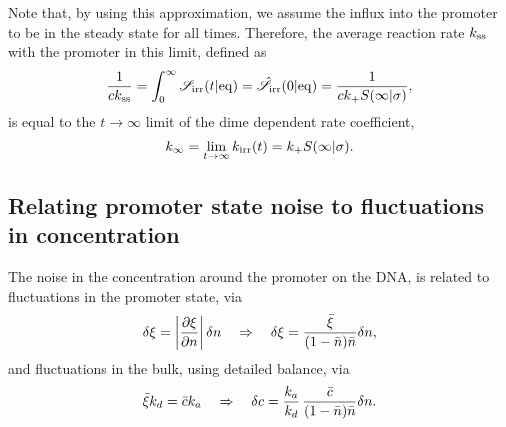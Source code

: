 Note that, by using this approximation, we assume the influx into the promoter to be in the steady state for all times. Therefore, the average reaction rate $k_{\rm ss}$ with the promoter in this limit, defined as
\begin{equation}
 \frac{1}{c k_{\rm ss}} = \int_0^\infty \mathscr{S}_{\rm irr}(t|{\rm eq}) = \hat{\mathscr{S}}_{\rm irr}(0|{\rm eq}) = \frac{1}{c k_+ S(\infty|\sigma)},
\end{equation}
is equal to the $t\to\infty$ limit of the dime dependent rate coefficient, 
\begin{equation}
 k_{\infty} = \lim_{t \to \infty} k_{{\rm irr}}(t) = k_+ S(\infty|\sigma).
\end{equation}


\subsection{Relating promoter state noise to fluctuations in concentration}
The noise in the concentration around the promoter on the DNA, is related to fluctuations in the promoter state, via 
\begin{equation}
 \delta \xi = \left|\frac{\partial \xi}{\partial n}\right| \delta n \quad \Rightarrow \quad  \delta \xi = \frac{\bar{\xi}}{(1-\bar{n})\bar{n}}\delta n,
 \elabel{EqxiNoise}
\end{equation}
and fluctuations in the bulk, using detailed balance, via
\begin{equation}
 \bar{\xi} k_d = \bar{c} k_a \quad \Rightarrow \quad \delta c = \frac{k_a}{k_d} \, \frac{\bar{c}}{(1-\bar{n})\bar{n}}\delta n.
 \elabel{EqcNoise}
\end{equation}


